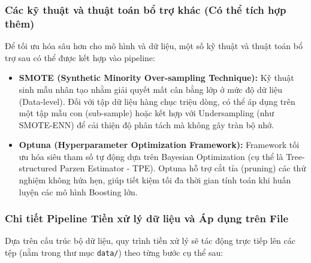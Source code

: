 \subsubsection{Các kỹ thuật và thuật toán bổ trợ khác (Có thể tích hợp thêm)}
Để tối ưu hóa sâu hơn cho mô hình và dữ liệu, một số kỹ thuật và thuật toán bổ trợ sau có thể được kết hợp vào pipeline:
\begin{itemize}
    \item \textbf{SMOTE (Synthetic Minority Over-sampling Technique):} Kỹ thuật sinh mẫu nhân tạo nhằm giải quyết mất cân bằng lớp ở mức độ dữ liệu (Data-level). Đối với tập dữ liệu hàng chục triệu dòng, có thể áp dụng trên một tập mẫu con (sub-sample) hoặc kết hợp với Undersampling (như SMOTE-ENN) để cải thiện độ phân tách mà không gây tràn bộ nhớ.
    \item \textbf{Optuna (Hyperparameter Optimization Framework):} Framework tối ưu hóa siêu tham số tự động dựa trên Bayesian Optimization (cụ thể là Tree-structured Parzen Estimator - TPE). Optuna hỗ trợ cắt tỉa (pruning) các thử nghiệm không hứa hẹn, giúp tiết kiệm tối đa thời gian tính toán khi huấn luyện các mô hình Boosting lớn.
\end{itemize}

\subsubsection{Chi tiết Pipeline Tiền xử lý dữ liệu và Áp dụng trên File}
Dựa trên cấu trúc bộ dữ liệu, quy trình tiền xử lý sẽ tác động trực tiếp lên các tệp (nằm trong thư mục \texttt{data/}) theo từng bước cụ thể sau:

